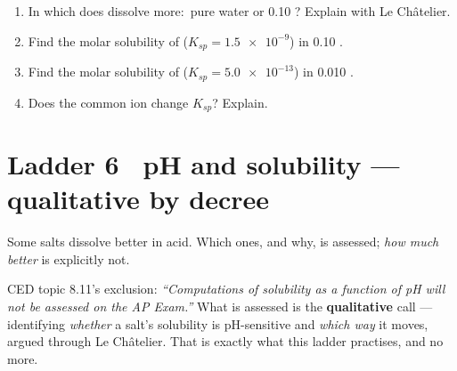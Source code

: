 \documentclass{apchem-worksheet}
\begin{document}
\begin{yourturn}
\begin{enumerate}[leftmargin=*,itemsep=0.5em]
  \item In which does  dissolve more:\ pure water or
        \SI{0.10}{\Molar} ? Explain with
        Le Ch\^{a}telier. \workspace[1.8cm]
  \item Find the molar solubility of 
        ($K_{sp} = \num{1.5e-9}$) in \SI{0.10}{\Molar} .
        \workspace[2.0cm]
  \item Find the molar solubility of 
        ($K_{sp} = \num{5.0e-13}$) in \SI{0.010}{\Molar} .
        \workspace[2.0cm]
  \item Does the common ion change $K_{sp}$? Explain.
        \workspace[1.6cm]
\end{enumerate}
\end{yourturn}

\section*{\sffamily Ladder 6 \textbullet\ pH and solubility ---
qualitative by decree}

Some salts dissolve better in acid. Which ones, and why, is assessed;
\emph{how much better} is explicitly not.

\begin{apcnote}
CED topic 8.11's exclusion: \emph{``Computations of solubility as a
function of pH will not be assessed on the AP Exam.''} What is
assessed is the \textbf{qualitative} call --- identifying \emph{whether}
a salt's solubility is pH-sensitive and \emph{which way} it moves,
argued through Le Ch\^{a}telier. That is exactly what this ladder
practises, and no more.
\end{apcnote}
\end{document}
